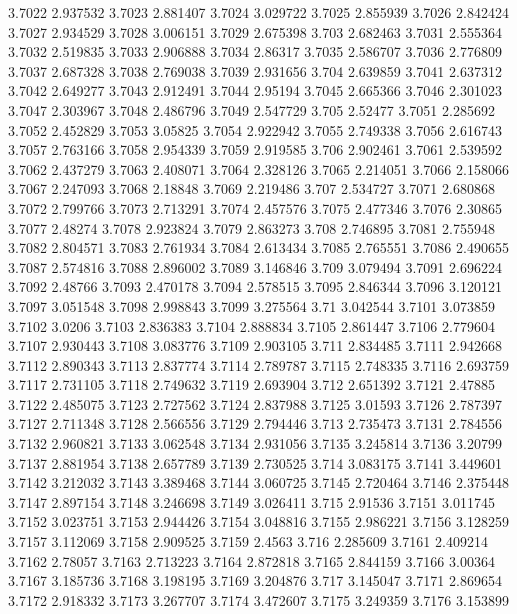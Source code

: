 3.7022  2.937532
3.7023  2.881407
3.7024  3.029722
3.7025  2.855939
3.7026  2.842424
3.7027  2.934529
3.7028  3.006151
3.7029  2.675398
3.703  2.682463
3.7031  2.555364
3.7032  2.519835
3.7033  2.906888
3.7034  2.86317
3.7035  2.586707
3.7036  2.776809
3.7037  2.687328
3.7038  2.769038
3.7039  2.931656
3.704  2.639859
3.7041  2.637312
3.7042  2.649277
3.7043  2.912491
3.7044  2.95194
3.7045  2.665366
3.7046  2.301023
3.7047  2.303967
3.7048  2.486796
3.7049  2.547729
3.705  2.52477
3.7051  2.285692
3.7052  2.452829
3.7053  3.05825
3.7054  2.922942
3.7055  2.749338
3.7056  2.616743
3.7057  2.763166
3.7058  2.954339
3.7059  2.919585
3.706  2.902461
3.7061  2.539592
3.7062  2.437279
3.7063  2.408071
3.7064  2.328126
3.7065  2.214051
3.7066  2.158066
3.7067  2.247093
3.7068  2.18848
3.7069  2.219486
3.707  2.534727
3.7071  2.680868
3.7072  2.799766
3.7073  2.713291
3.7074  2.457576
3.7075  2.477346
3.7076  2.30865
3.7077  2.48274
3.7078  2.923824
3.7079  2.863273
3.708  2.746895
3.7081  2.755948
3.7082  2.804571
3.7083  2.761934
3.7084  2.613434
3.7085  2.765551
3.7086  2.490655
3.7087  2.574816
3.7088  2.896002
3.7089  3.146846
3.709  3.079494
3.7091  2.696224
3.7092  2.48766
3.7093  2.470178
3.7094  2.578515
3.7095  2.846344
3.7096  3.120121
3.7097  3.051548
3.7098  2.998843
3.7099  3.275564
3.71  3.042544
3.7101  3.073859
3.7102  3.0206
3.7103  2.836383
3.7104  2.888834
3.7105  2.861447
3.7106  2.779604
3.7107  2.930443
3.7108  3.083776
3.7109  2.903105
3.711  2.834485
3.7111  2.942668
3.7112  2.890343
3.7113  2.837774
3.7114  2.789787
3.7115  2.748335
3.7116  2.693759
3.7117  2.731105
3.7118  2.749632
3.7119  2.693904
3.712  2.651392
3.7121  2.47885
3.7122  2.485075
3.7123  2.727562
3.7124  2.837988
3.7125  3.01593
3.7126  2.787397
3.7127  2.711348
3.7128  2.566556
3.7129  2.794446
3.713  2.735473
3.7131  2.784556
3.7132  2.960821
3.7133  3.062548
3.7134  2.931056
3.7135  3.245814
3.7136  3.20799
3.7137  2.881954
3.7138  2.657789
3.7139  2.730525
3.714  3.083175
3.7141  3.449601
3.7142  3.212032
3.7143  3.389468
3.7144  3.060725
3.7145  2.720464
3.7146  2.375448
3.7147  2.897154
3.7148  3.246698
3.7149  3.026411
3.715  2.91536
3.7151  3.011745
3.7152  3.023751
3.7153  2.944426
3.7154  3.048816
3.7155  2.986221
3.7156  3.128259
3.7157  3.112069
3.7158  2.909525
3.7159  2.4563
3.716  2.285609
3.7161  2.409214
3.7162  2.78057
3.7163  2.713223
3.7164  2.872818
3.7165  2.844159
3.7166  3.00364
3.7167  3.185736
3.7168  3.198195
3.7169  3.204876
3.717  3.145047
3.7171  2.869654
3.7172  2.918332
3.7173  3.267707
3.7174  3.472607
3.7175  3.249359
3.7176  3.153899
